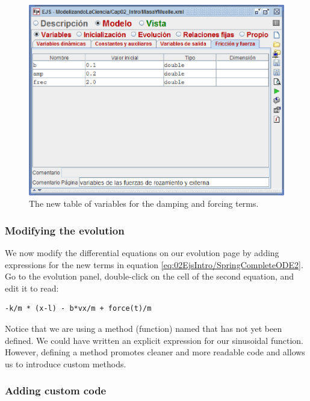 \begin{figure}[htb]
    \centering
  \includegraphics[scale=\scale]{02EjsIntro/images/ModifyVariables2.eps}
    \caption{The new table of variables for the damping and forcing terms. }
    \label{fig:02EjsIntro/ModifyVariables2}
\end{figure}

\subsubsection{Modifying the evolution}

We now modify the differential equations on our evolution page by adding expressions for the new terms in equation
\eqref{eq:02EjsIntro/SpringCompleteODE2}. Go to the evolution panel, double-click on the  cell of the
second equation, and edit it to read:

\begin{listing}
\begin{verbatim}
-k/m * (x-l) - b*vx/m + force(t)/m
\end{verbatim}
\end{listing}

Notice that we are using a method (function) named  that has not yet been defined.
We could have written an explicit expression for our sinusoidal function. However, defining a  method promotes cleaner and more readable code and allows us to introduce custom methods.

\subsubsection{Adding custom code}


